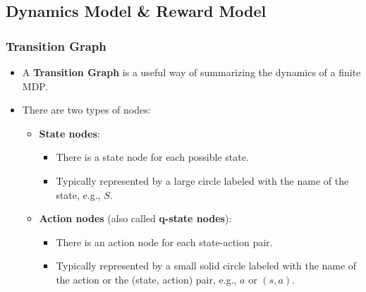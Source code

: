 \begin{example}
    
\end{example}

\subsection{Dynamics Model \& Reward Model}

\begin{example}
    
\end{example}

\begin{example}
    
\end{example}

\subsubsection{Transition Graph}
\begin{definition}
    \begin{itemize}
        \item A \textbf{Transition Graph} is a useful way of summarizing the dynamics of a finite MDP.
        
        \item There are two types of nodes:
        \begin{itemize}
            \item \textbf{State nodes}:
            \begin{itemize}
                \item There is a state node for each possible state.
                \item Typically represented by a large circle labeled with the name of the state, e.g., \( S \).
            \end{itemize}
            
            \item \textbf{Action nodes} (also called \textbf{q-state nodes}):
            \begin{itemize}
                \item There is an action node for each state-action pair.
                \item Typically represented by a small solid circle labeled with the name of the action or the (state, action) pair, e.g., \( a \) or \( (s, a) \).
            \end{itemize}
        \end{itemize}
    \end{itemize}
\end{definition}
